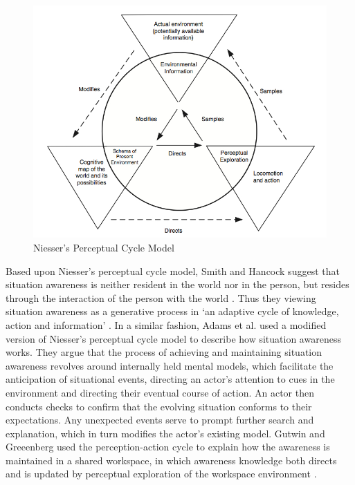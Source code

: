 \begin{figure}[htbp] %
   \centering
   \includegraphics[width=5in]{perceptual_cycle.jpg} 
   \caption{Niesser's Perceptual Cycle Model \cite{Salmon2008}}
   \label{fig:perceptual_cycle}
\end{figure}

Based upon Niesser’s perceptual cycle model, Smith and Hancock suggest that situation awareness is neither resident in the world nor in the person, but resides through the interaction of the person with the world \cite{Smith1995}. Thus they viewing situation awareness as a generative process in `an adaptive cycle of knowledge, action and information' \cite{Smith1995}. In a similar fashion, Adams et al. \cite{Adams1995} used a modified version of Niesser’s perceptual cycle model to describe how situation awareness works. They argue that the process of achieving and maintaining situation awareness revolves around internally held mental models, which facilitate the anticipation of situational events, directing an actor's attention to cues in the environment and directing their eventual course of action. An actor then conducts checks to confirm that the evolving situation conforms to their expectations. Any unexpected events serve to prompt further search and explanation, which in turn modifies the actor's existing model. Gutwin and Greeenberg used the perception-action cycle to explain how the awareness is maintained in a shared workspace, in which awareness knowledge both directs and is updated by perceptual exploration of the workspace environment \cite{Gutwin2002}.

